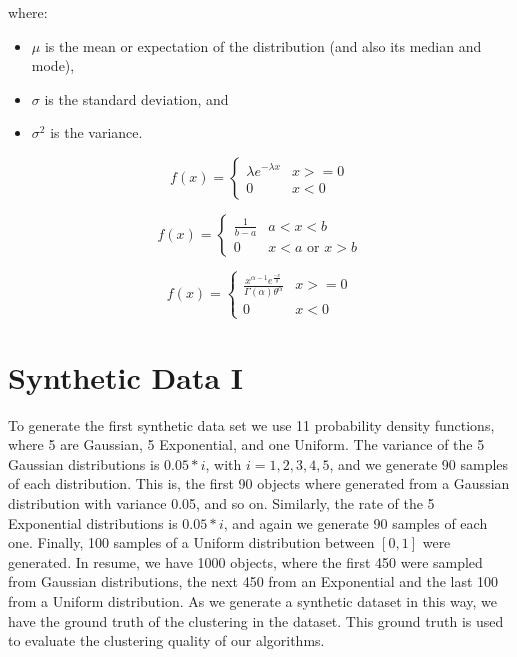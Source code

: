 where:
\begin{itemize}
\item $\mu$ is the mean or expectation of the distribution (and also its median and mode),
\item $\sigma$ is the standard deviation, and
\item $\sigma^2$ is the variance.
\end{itemize}


\begin{equation}
  f(x) =
  \begin{cases}
    \lambda e^{-\lambda x} & \text{$x >= 0 $} \\
    0 & \text{$x < 0$}
  \end{cases}
\end{equation}

\begin{equation}
  f(x) =
  \begin{cases}
    \frac{1}{b-a} & \text{$a < x < b$} \\
    0 & \text{$x < a$ or $x > b$}
  \end{cases}
\end{equation}

\begin{equation}
  f(x) =
  \begin{cases}
    \frac{x^{\alpha-1}e^{\frac{-x}{\theta}}}{\Gamma(\alpha)\theta^{\alpha}} & \text{$x >= 0 $} \\
    0 & \text{$x < 0$}
  \end{cases}
\end{equation}

\section{Synthetic Data I}
To generate the first synthetic data set we use 11 probability density functions, where 5 are Gaussian, 5 Exponential, and one Uniform. The variance of the 5 Gaussian distributions is $0.05*i$, with $i=1, 2, 3, 4, 5$, and we generate 90 samples of each distribution. This is, the first 90 objects where generated from a Gaussian distribution with variance 0.05, and so on. Similarly, the rate of the 5 Exponential distributions is $0.05*i$, and again we generate 90 samples of each one. Finally, 100 samples of a Uniform distribution between $[0, 1]$ were generated. In resume, we have 1000 objects, where the first 450 were sampled from Gaussian distributions, the next 450 from an Exponential and the last 100 from a Uniform distribution. As we generate a synthetic dataset in this way, we have the ground truth of the clustering in the dataset. This ground truth is used to evaluate the clustering quality of our algorithms.

